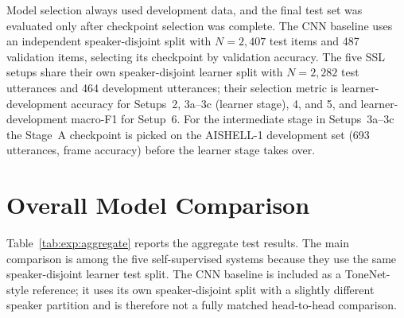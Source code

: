 Model selection always used development data, and the final test set was
evaluated only after checkpoint selection was complete. The CNN baseline uses
an independent speaker-disjoint split with $N=2{,}407$ test items and 487
validation items, selecting its checkpoint by validation accuracy. The five
SSL setups share their own speaker-disjoint learner split with $N=2{,}282$
test utterances and 464 development utterances; their selection metric is
learner-development accuracy for Setups~2, 3a--3c (learner stage), 4, and 5,
and learner-development macro-F1 for Setup~6. For the intermediate stage in
Setups~3a--3c the Stage~A checkpoint is picked on the AISHELL-1 development
set (693 utterances, frame accuracy) before the learner stage takes over.

\section{Overall Model Comparison}
\label{sec:exp:aggregate}

Table~\ref{tab:exp:aggregate} reports the aggregate test results. The main
comparison is among the five self-supervised systems because they use the same
speaker-disjoint learner test split. The CNN baseline is included as a
ToneNet-style reference; it uses its own speaker-disjoint split with a
slightly different speaker partition and is therefore not a fully matched
head-to-head comparison.

